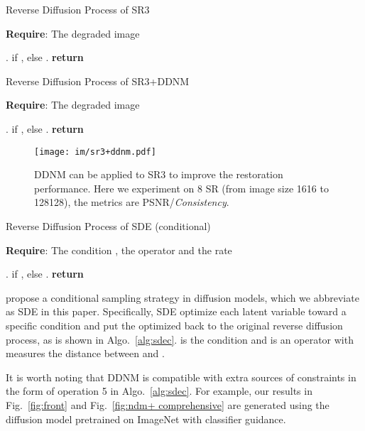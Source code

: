\documentclass{article} \usepackage{iclr2023_conference,times}
\begin{document}
\begin{algorithm}[h]
\caption{Reverse Diffusion Process of SR3}
\label{alg:sr3}
\textbf{Require}: The degraded image 
\begin{algorithmic}[1] \State .
\For{}
\State  if , else .
\State 
\EndFor
\State \textbf{return} 
\end{algorithmic}
\end{algorithm}



\begin{algorithm}[h]
\caption{Reverse Diffusion Process of SR3+DDNM}
\label{alg:sr3+ddnm}
\textbf{Require}: The degraded image 
\begin{algorithmic}[1] \State .
\For{}
\State  if , else .
\State 
\State 
\State 
\EndFor
\State \textbf{return} 
\end{algorithmic}
\end{algorithm}
\begin{figure*}[!h]
  \centering
\texttt{[image: im/sr3+ddnm.pdf]}
  \caption{DDNM can be applied to SR3 to improve the restoration performance. Here we experiment on 8 SR (from image size 1616 to 128128), the metrics are PSNR/\textit{Consistency}.}
\label{fig:sr3+ddnm} 
\end{figure*}
\begin{algorithm}[h]
\caption{Reverse Diffusion Process of SDE (conditional)}
\label{alg:sdec}
\textbf{Require}: The condition , the operator  and the rate 
\begin{algorithmic}[1] \State .
\For{}
\State  if , else .
\State \textcolor{blue}{}
\State 
\EndFor
\State \textbf{return} 
\end{algorithmic}
\end{algorithm}

\newpage

\cite{song2020score} propose a conditional sampling strategy in diffusion models, which we abbreviate as SDE in this paper. Specifically, SDE optimize each latent variable  toward a specific condition  and put the optimized  back to the original reverse diffusion process, as is shown in Algo.~\ref{alg:sdec}.  is the condition and  is an operator with  measures the distance between  and . 

It is worth noting that DDNM is compatible with extra sources of constraints in the form of operation 5 in Algo.~\ref{alg:sdec}. For example, our results in Fig.~\ref{fig:front} and Fig.~\ref{fig:ndm+ comprehensive} are generated using the diffusion model pretrained on ImageNet with classifier guidance.
\end{document}
